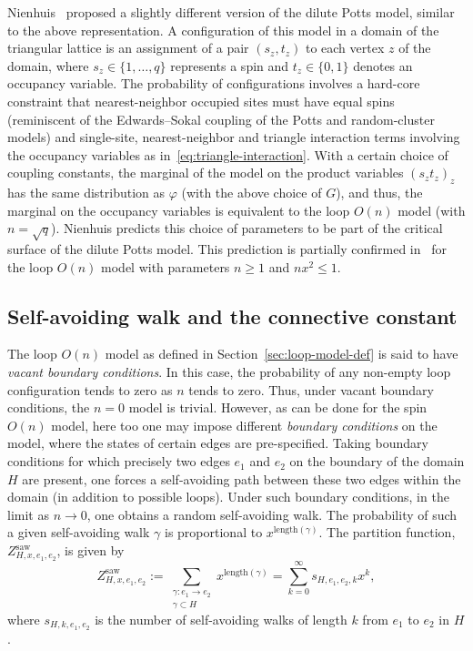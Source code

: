 \documentclass[12pt,reqno]{article}
\begin{document}
Nienhuis~\cite{nienhuis1991locus} proposed a slightly different version of the dilute Potts model, similar to the above representation. A configuration of this model in a domain of the triangular lattice is an
assignment of a pair $(s_z, t_z)$ to each vertex $z$ of the domain,
where $s_z\in\{1,\ldots, q\}$ represents a spin and $t_z\in\{0,1\}$
denotes an occupancy variable. The probability of configurations
involves a hard-core constraint that nearest-neighbor occupied sites
must have equal spins (reminiscent of the Edwards--Sokal coupling of
the Potts and random-cluster models) and single-site,
nearest-neighbor and triangle interaction terms involving the
occupancy variables as in~\eqref{eq:triangle-interaction}. With a certain choice of coupling constants,
the marginal of the model on the product variables $(s_z t_z)_z$ has the same distribution as $\varphi$ (with the above choice of $G$), and thus, the marginal on the occupancy variables is equivalent to the loop $O(n)$ model (with $n=\sqrt{q}$). Nienhuis
predicts this choice of parameters to be part of the critical
surface of the dilute Potts model. This prediction is partially confirmed in~\cite{macroscopicloops2017} for the loop $O(n)$ model with parameters $n\ge 1$ and $nx^2\le 1$.


\subsection{Self-avoiding walk and the connective constant}
\label{sec:saw}

The loop $O(n)$ model as defined in Section~\ref{sec:loop-model-def} is said to have \emph{vacant boundary conditions}. In this case, the probability of any non-empty loop configuration tends to zero as $n$ tends to zero. Thus, under vacant boundary conditions, the $n=0$ model is trivial.
However, as can be done for the spin $O(n)$ model, here too one may impose different \emph{boundary conditions} on the model, where the states of certain edges are pre-specified. Taking boundary conditions for which precisely two edges $e_1$ and $e_2$ on the boundary of the domain $H$ are present, one forces a self-avoiding path between these two edges within the domain (in addition to possible loops). Under such boundary conditions, in the limit as $n \to 0$, one obtains a random self-avoiding walk. The probability of such a given self-avoiding walk $\gamma$ is proportional to $x^{\text{length}(\gamma)}$.
The partition function, $Z_{H,x,e_1,e_2}^{\text{saw}}$, is given by
\[ Z_{H,x,e_1,e_2}^{\text{saw}} := \sum_{\substack{\gamma: e_1 \to e_2\\\gamma \subset H}} x^{\text{length}(\gamma)} = \sum_{k=0}^\infty s_{H,e_1,e_2,k} x^k ,\]
where $s_{H,k,e_1,e_2}$ is the number of self-avoiding walks of length $k$ from $e_1$ to $e_2$ in $H$.
\end{document}
